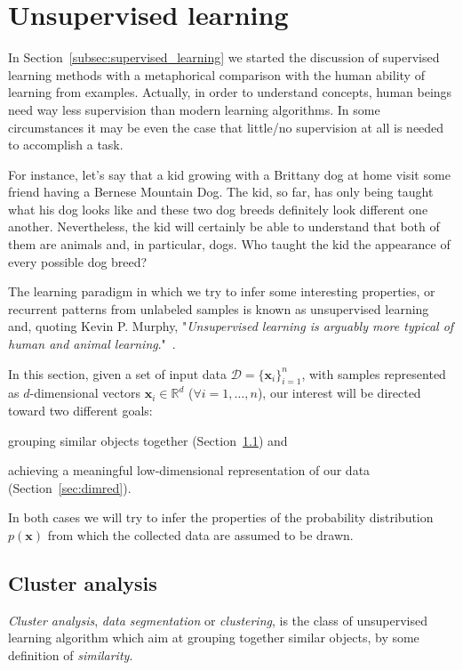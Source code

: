 
  \section{Unsupervised learning} \label{subsec:unsupervised_learning}
  In Section~\ref{subsec:supervised_learning} we started the discussion of supervised learning methods with a metaphorical comparison with the human ability of learning from examples.
  Actually, in order to understand concepts, human beings need way less supervision than modern learning algorithms.
  In some circumstances it may be even the case that little/no supervision at all is needed to accomplish a task.

  For instance, let's say that a kid growing with a Brittany dog at home visit some friend having a Bernese Mountain Dog.
  The kid, so far, has only being taught what his dog looks like and these two dog breeds definitely look different one another.
  Nevertheless, the kid will certainly be able to understand that both of them are animals and, in particular, dogs.
  Who taught the kid the appearance of every possible dog breed?
  
  The learning paradigm in which we try to infer some interesting properties, or recurrent patterns from unlabeled samples is known as unsupervised learning and,
  quoting Kevin P. Murphy, "\textit{Unsupervised learning is arguably more typical of human and animal learning}."~\cite{murphy2012machine}.
  
  In this section, given a set of input data $\mathcal{D}=\{\bm{x}_i\}_{i=1}^n$, with samples represented as $d$-dimensional vectors $\bm{x}_i \in \mathbb{R}^d$ ($\forall i=1,\dots,n$), our interest will be directed toward two different goals:
  \begin{enumerate*}[label=(\roman*)]
  	\item grouping similar objects together (Section~\ref{sec:clustering}) and
  	\item achieving a meaningful low-dimensional representation of our data (Section~\ref{sec:dimred}).
  \end{enumerate*}
  In both cases we will try to infer the properties of the probability distribution $p(\bm{x})$ from which the collected data are assumed to be drawn.
  
    \subsection{Cluster analysis} \label{sec:clustering}
    \textit{Cluster analysis}, \aka \textit{data segmentation} or \textit{clustering}, is the class of unsupervised learning algorithm which aim at grouping together similar objects, by some definition of \textit{similarity}.
        
